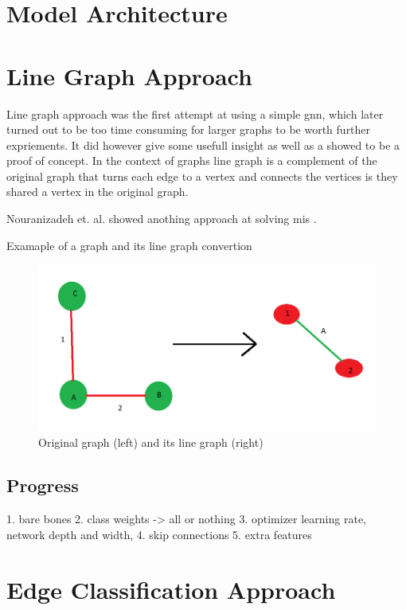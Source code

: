 \section{Model Architecture}

\section{Line Graph Approach}

Line graph approach was the first attempt at using a simple \gls{gnn}, which later turned out to be too time consuming for larger graphs to be worth further expriements. It did however give some usefull insight as well as a showed to be a proof of concept. In the context of graphs line graph is a complement of the original graph that turns each edge to a vertex and connects the vertices is they shared a vertex in the original graph. 

Nouranizadeh et. al. showed anothing approach at solving \gls{mis} \cite{DBLPjournals/corr/abs-2107-01410}.

Examaple of a graph and its line graph convertion
\begin{figure}[H]
    \centering
    \includegraphics[scale=0.5]{figures/LineGraphExample}
    \caption{Original graph (left) and its line graph (right)}
    \label{Line graph figure}
\end{figure}

\subsection{Progress}

1. bare bones
2. class weights -> all or nothing
3. optimizer learning rate, network depth and width, 
4. skip connections
5. extra features

\section{Edge Classification Approach}

